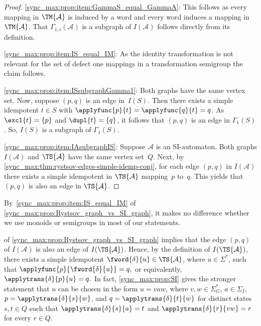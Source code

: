 \begin{proof}
\ref{sync_max:prop:item:GammaS_equal_GammaA}: This follows as every mapping in $\TM{\mathcal A}$
is induced by a word and every word induces a mapping in $\TM{\mathcal A}$. That
$\Gamma_{1,i}(\mathcal A)$ is a subgraph of $I(\mathcal A)$ follows directly from its definition.

\ref{sync_max:prop:item:IS_equal_IM}:  As the identity transformation is not relevant
for the set of defect one mappings in a transformation semigroup the claim follows.

\ref{sync_max:prop:item:ISsubgraphGamma1}: Both graphs have the same vertex set. Now, suppose $(p,q)$ is an edge in~$I(S)$.
Then there exists a simple idempotent $t \in S$ with $\applyfunc{p}{t} = \applyfunc{q}{t} = q$.
As $\excl{t} = \{p\}$ and $\dupl{t} = \{q\}$,
it follows that $(p,q)$ is an edge in $\Gamma_1(S)$.
So, $I(S)$ is a subgraph of $\Gamma_1(S)$.

\ref{sync_max:prop:item:IAsubgraphIS}: Suppose $\mathcal A$ is an SI-automaton.
Both graphs $I(\mathcal A)$ and $\TS{\mathcal A}$ have the same vertex set~$Q$.
Next, by \cref{sync_max:thm:rystsov-edges-simple-idemp-conj},
for each edge $(p, q)$ in $I(\mathcal A)$
there exists a simple idempotent in $\TS{\mathcal A}$ mapping~$p$ to~$q$.
This yields that $(p,q)$ is also an edge in $\TS{\mathcal A}$.
\end{proof}

By~\cref{sync_max:prop:item:IS_equal_IM} of \cref{sync_max:prop:Rystsov_graph_vs_SI_graph},
it makes no difference whether we use monoids or semigroups in most of our statements.

\begin{remark}\label{sync_max:rem:Rystsov-edges-and-words}	
	 of
	\cref{sync_max:prop:Rystsov_graph_vs_SI_graph} implies that the edge
	$(p,q)$ of $I(\mathcal A)$ is also an edge of $I(\TS{\mathcal A})$.
	Hence, by the definition of $I(\TS{\mathcal A})$, there exists a simple
	idempotent $\fword{\delta}{u} \in \TS{\mathcal A}$, where $u \in \Sigma^*$,
	such that
	$
	\applyfunc{p}{\fword{\delta}{u}} = q,
	$
	or equivalently,
	$
	\applytrans{\delta}{p}{u} = q.
	$
	In fact, \cref{sync_max:prop:SI} gives the stronger statement that
	$u$ can be chosen in the form $u = vaw$, where
	$v,w \in \Sigma_G^*$, $a \in \Sigma_I$,
	$p = \applytrans{\delta}{s}{w}$, and
	$q = \applytrans{\delta}{t}{w}$
	for distinct states $s,t \in Q$ such that
	$\applytrans{\delta}{s}{a} = t$
	and
	$\applytrans{\delta}{r}{vw} = r$
	for every $r \in Q$.
\end{remark} 

